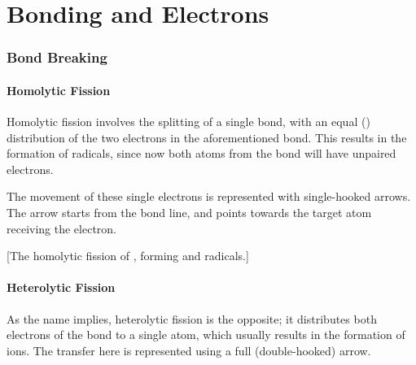 

\pagebreak
\hypertarget{ChapterBondingAndElectrons}{}
\part{Bonding and Electrons}

	\section{Bond Breaking}
		\subsection{Homolytic Fission}

			Homolytic fission involves the splitting of a single bond, with an equal () distribution of the two electrons
			in the aforementioned bond. This results in the formation of radicals, since now both atoms from the bond will have
			unpaired electrons.

			The movement of these single electrons is represented with single-hooked arrows. The arrow starts from the bond line, and points
			towards the target atom receiving the electron.

			[The homolytic fission of , forming  and  radicals.]


		\subsection{Heterolytic Fission}

			As the name implies, heterolytic fission is the opposite; it distributes both electrons of the bond to a single atom, which
			usually results in the formation of ions. The transfer here is represented using a full (double-hooked) arrow.


